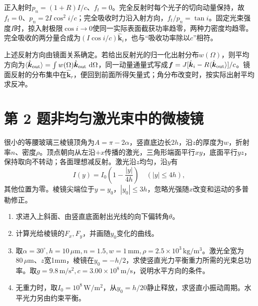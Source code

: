 \documentclass[UTF8,fontset=fandol,a4paper,11pt]{ctexart}
\newcommand{\dd}{\mathop{}\!\mathrm{d}}
\begin{document}
正入射时$p_n=(1+R)I/c$、$f_t=0$。完全反射时每个光子的切向动量保持，故$f_t=0$、$p_n=2I\cos^2i/c$；完全吸收时力沿入射方向，$f_t/p_n=\tan i$。固定光束强度$I$时，掠入射极限$\cos i\to0$使同一实际表面截获功率趋零，两种力密度均趋零。完全吸收的两分量合成为$(I\cos i/c)\hat{\boldsymbol k}_i$，也与“吸收功率除以$c$”相符。

上述反射方向由镜面关系确定。若给出反射光的归一化出射分布$w(\Omega)$，则平均方向为$\langle\hat{\boldsymbol k}_{\rm out}\rangle=\int w(\Omega)\hat{\boldsymbol k}_{\rm out}\,\dd\Omega$，同一动量通量式写成$\boldsymbol f=J[\hat{\boldsymbol k}_i-R\langle\hat{\boldsymbol k}_{\rm out}\rangle]/c$。镜面反射的分布集中在$\hat{\boldsymbol k}_r$，便回到前面所得矢量式；角分布改变时，按实际出射平均求反冲。




\section*{第 2 题\quad 非均匀激光束中的微棱镜}\label{q:2}

很小的等腰玻璃三棱镜顶角为$A=\pi-2\alpha$，竖直底边长$2h$，沿$z$的厚度为$w$，折射率$n$、密度$\rho$。顶点朝向从左沿$+x$传播的激光，三角形端面平行$xy$，底面平行$yz$，保持取向不转动；各面理想减反射。激光沿$z$均匀，沿$y$有
\[
I(y)=I_0\left(1-\frac{|y|}{4h}\right)\quad(|y|\leqslant4h),
\]
其他位置为零。棱镜尖端位于$y=y_0$，$|y_0|\leqslant3h$，忽略光强随$x$改变和运动的多普勒修正。
\begin{enumerate}[label=（\arabic*）]
\item 求进入上斜面、由竖直底面射出光线的向下偏转角$\theta$。
\item 计算光给棱镜的$F_x,F_y$，并画随$y_0$变化的曲线。
\item 取$\alpha=30^\circ,h=10\,\mu\mathrm m,n=1.5,w=1\,\mathrm{mm},\rho=2.5\times10^3\,\mathrm{kg/m^3}$。激光全宽为$80\,\mu\mathrm m$、$z$宽1mm，棱镜在$y_0=-h/2$，求使竖直光力平衡重力所需的光束总功率。取$g=9.8\,\mathrm{m/s^2},c=3.00\times10^8\,\mathrm{m/s}$，说明水平方向的条件。
\item 无重力时，取$I_0=10^8\,\mathrm{W/m^2}$，从$y_0=h/20$静止释放，求竖直小振动周期。水平光力另由约束平衡。
\end{enumerate}
\end{document}
